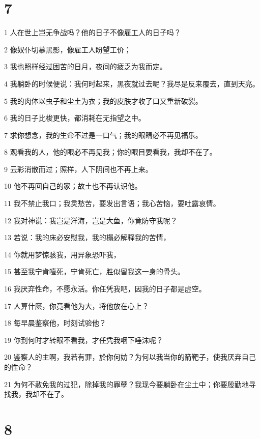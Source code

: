 \chapter{7}

\par 1 人在世上岂无争战吗？他的日子不像雇工人的日子吗？
\par 2 像奴仆切慕黑影，像雇工人盼望工价；
\par 3 我也照样经过困苦的日月，夜间的疲乏为我而定。
\par 4 我躺卧的时候便说：我何时起来，黑夜就过去呢？我尽是反来覆去，直到天亮。
\par 5 我的肉体以虫子和尘土为衣；我的皮肤才收了口又重新破裂。
\par 6 我的日子比梭更快，都消耗在无指望之中。
\par 7 求你想念，我的生命不过是一口气；我的眼睛必不再见福乐。
\par 8 观看我的人，他的眼必不再见我；你的眼目要看我，我却不在了。
\par 9 云彩消散而过；照样，人下阴间也不再上来。
\par 10 他不再回自己的家；故土也不再认识他。
\par 11 我不禁止我口；我灵愁苦，要发出言语；我心苦恼，要吐露哀情。
\par 12 我对神说：我岂是洋海，岂是大鱼，你竟防守我呢？
\par 13 若说：我的床必安慰我，我的榻必解释我的苦情，
\par 14 你就用梦惊骇我，用异象恐吓我，
\par 15 甚至我宁肯噎死，宁肯死亡，胜似留我这一身的骨头。
\par 16 我厌弃性命，不愿永活。你任凭我吧，因我的日子都是虚空。
\par 17 人算什麽，你竟看他为大，将他放在心上？
\par 18 每早晨鉴察他，时刻试验他？
\par 19 你到何时才转眼不看我，才任凭我咽下唾沫呢？
\par 20 鉴察人的主啊，我若有罪，於你何妨？为何以我当你的箭靶子，使我厌弃自己的性命？
\par 21 为何不赦免我的过犯，除掉我的罪孽？我现今要躺卧在尘土中；你要殷勤地寻找我，我却不在了。

\chapter{8}

